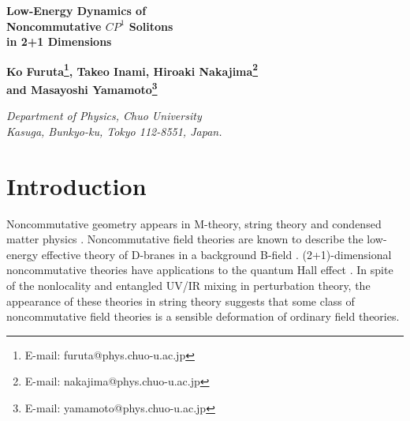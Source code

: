 \documentclass[a4paper,12pt]{article}
\begin{document}
\setcounter{page}{0}

\begin{titlepage}

\bigskip

\begin{center}
{\LARGE\bf
Low-Energy Dynamics of\\ Noncommutative $CP^1$ Solitons\\ \vspace{3mm}
in 2+1 Dimensions}

\vspace{10mm}

\bigskip
{\renewcommand{\thefootnote}{\fnsymbol{footnote}}
\large\bf 
Ko Furuta\footnote{
E-mail: furuta@phys.chuo-u.ac.jp}, 
Takeo Inami, 
Hiroaki Nakajima\footnote{
E-mail: nakajima@phys.chuo-u.ac.jp}\\
and Masayoshi Yamamoto\footnote{
E-mail: yamamoto@phys.chuo-u.ac.jp}
}

\setcounter{footnote}{0}
\bigskip

{\small \it
Department of Physics, Chuo University\\
Kasuga, Bunkyo-ku, Tokyo 112-8551, Japan.\\
}

\end{center}
\bigskip


\begin{abstract}
We investigate the low-energy dynamics of the BPS solitons of the noncommutative $CP^1$ model 
in 2+1 dimensions using the moduli space metric of the BPS solitons. 
We show that the dynamics of a single soliton coincides with that in the commutative model. 
We find that the singularity in the two-soliton moduli space, which exists in the 
commutative $CP^1$ model, disappears in the noncommutative model.
We also show that the two-soliton metric has the smooth commutative limit.
\end{abstract}

\end{titlepage}


\section{Introduction}

Noncommutative geometry appears in M-theory, string theory and condensed matter physics 
\cite{Nek}.
Noncommutative field theories are known to describe the low-energy effective theory of D-branes
in a background B-field \cite{CDS,CK,SW}.
(2+1)-dimensional noncommutative theories have applications to the quantum Hall effect 
\cite{Suss etc}. 
In spite of the nonlocality and entangled UV/IR mixing 
in perturbation theory, the appearance of these theories 
in string theory suggests that some class of noncommutative 
field theories is a sensible deformation of ordinary 
field theories.
\end{document}
